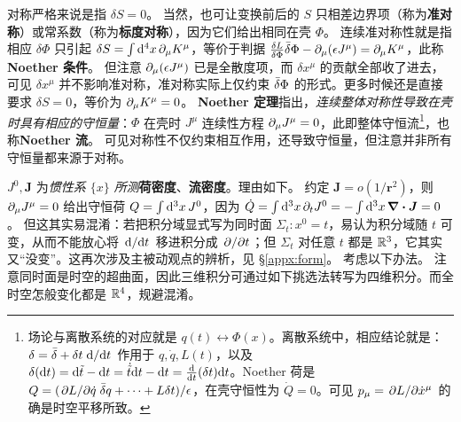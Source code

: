 对称严格来说是指 $\delta S=0$。
当然，也可让变换前后的 $S$ 只相差边界项（称为\textbf{准对称}）或常系数（称为\textbf{标度对称}），因为它们给出相同在壳 $\Phi$。
连续准对称性就是指相应 $\delta\Phi$ 只引起 $\delta S=\int \dd[4]{x} \partial_\mu K^\mu$，等价于判据 $\fdv{L}{\Phi} \bar\var\Phi - \p_\mu(\epsilon J^\mu) = \p_\mu K^\mu$，此称\textbf{Noether 条件}。
但注意 $\partial_\mu(\epsilon J^\mu)$ 已是全散度项，而 $\delta x^\mu$ 的贡献全部收了进去，可见 $\delta x^\mu$ 并不影响准对称，准对称实际上仅约束 $\bar\var\Phi$ 的形式。更多时候还是直接要求 $\delta S=0$，等价为 $\partial_\mu K^\mu=0$。
\textbf{Noether 定理}指出，\emph{连续整体对称性导致在壳时具有相应的守恒量}：$\Phi$ 在壳时 $J^\mu$ 连续性方程 $\partial_\mu J^\mu=0$，此即整体守恒流\footnote{场论与离散系统的对应就是 $q(t)\leftrightarrow \Phi(x)$。离散系统中，相应结论就是：$\delta=\bar\var+\delta t\dv*{t}$ 作用于 $q,\dot q,L(t)$，以及 $\delta(\dd t)=\dd\tilde t-\dd t=\dot{\tilde{t}}\dd t-\dd t=\dv{t}(\delta t)\dd t$。Noether 荷是 $Q = (\pdv*{L}{\dot q}\bar\var q+\cdots+L \delta t)/\epsilon$，在壳守恒性为 $\dot Q = 0$。可见 $p_\mu = \pdv*{L}{\dot x^\mu}$ 的确是时空平移所致。}，也称\textbf{Noether 流}。
可见对称性不仅约束相互作用，还导致守恒量，但注意并非所有守恒量都来源于对称。


$J^0,\bm J$ 为\emph{惯性系 $\{x\}$ 所测}\textbf{荷密度}、\textbf{流密度}。理由如下。
约定 $\bm J=o(1/\bm r^2)$，则 $\partial_\mu J^\mu=0$ 给出守恒荷 $Q=\int\dd[3]{x} J^0$，因为 $\dot Q=\int\dd[3]{x}\partial_t J^0=-\int\dd[3]{x}\div\bm J=0$。
但这其实易混淆：若把积分域显式写为同时面 $\Sigma_t:x^0=t$，易认为积分域随 $t$ 可变，从而不能放心将 $\dv*{t}$ 移进积分成 $\pdv*{t}$；但 $\Sigma_t$ 对任意 $t$ 都是 $\mathbb{R}^3$，它其实又“没变”。这再次涉及主被动观点的辨析，见 \S\ref{appx:form}。
考虑以下办法。
注意同时面是时空的超曲面，因此三维积分可通过如下挑选法转写为四维积分。而全时空怎般变化都是 $\mathbb{R}^4$，规避混淆。

